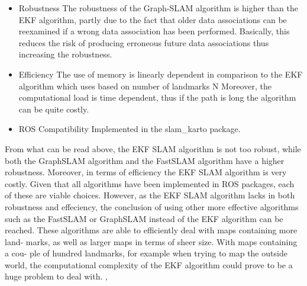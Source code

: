 \begin{itemize}
\begin{itemize}
            \item Robustness
                The robustness of the Graph-SLAM algorithm is higher than the EKF algorithm, partly due to the fact that older data associations can be reexamined if a wrong data association has been performed. Basically, this reduces the risk of producing erroneous future data associations thus increasing the robustness.
            \item Efficiency
                The use of memory is linearly dependent in comparison to the EKF algorithm which uses  based on number of landmarks N Moreover, the computational load is time dependent, thus if the path is long the algorithm can be quite costly. \cite{thrun2005}
            \item ROS Compatibility
                Implemented in the slam\_karto package.
        \end{itemize}  
\end{itemize}

From what can be read above, the EKF SLAM algorithm is not too robust, while both the GraphSLAM algorithm and the FastSLAM algorithm have a higher robustness. Moreover, in terms of efficiency the EKF SLAM algorithm is very costly. Given that all algorithms have been implemented in ROS packages, each of these are viable choices. However, as the EKF SLAM algorithm lacks in both robustness and effeciency, the conclusion of using other more effective algorithms such as the FastSLAM or GraphSLAM instead of the EKF algorithm can be reached. These algorithms are able to efficiently deal with maps containing more land- marks, as well as larger maps in terms of sheer size. With maps containing a cou- ple of hundred landmarks, for example when trying to map the outside world, the computational complexity of the EKF algorithm could prove to be a huge problem to deal with. \cite{thrun2013}, \cite{thrun2005}